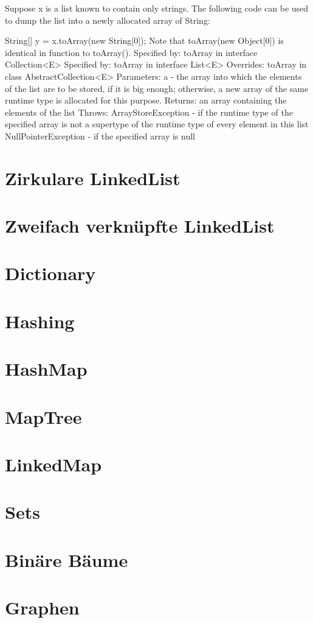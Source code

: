\documentclass[babel]{book}
\begin{document}
Suppose x is a list known to contain only strings. The following code can be used to dump the list into a newly allocated array of String:

String[] y = x.toArray(new String[0]);
Note that toArray(new Object[0]) is identical in function to toArray().
Specified by:
toArray in interface Collection<E>
Specified by:
toArray in interface List<E>
Overrides:
toArray in class AbstractCollection<E>
Parameters:
a - the array into which the elements of the list are to be stored, if it is big enough; otherwise, a new array of the same runtime type is allocated for this purpose.
Returns:
an array containing the elements of the list
Throws:
ArrayStoreException - if the runtime type of the specified array is not a supertype of the runtime type of every element in this list
NullPointerException - if the specified array is null
\section{Zirkulare LinkedList}
\section{Zweifach verknüpfte LinkedList}
\section{Dictionary}
\section{Hashing}
\section{HashMap}
\section{MapTree}
\section{LinkedMap}
\section{Sets}
\section{Binäre Bäume}
\section{Graphen}
\end{document}
